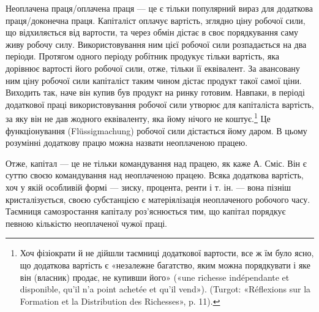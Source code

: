 \parcont{}  %
Неоплачена праця/оплачена праця — це є тільки популярний вираз для
додаткова праця/доконечна праця. Капіталіст оплачує вартість, зглядно ціну
робочої сили, що відхиляється від вартости, та через обмін дістає в своє порядкування саму живу
робочу силу. Використовування ним цієї робочої сили розпадається на два періоди. Протягом одного
періоду робітник продукує тільки вартість,
яка дорівнює вартості його робочої сили, отже, тільки її еквівалент.
За авансовану ним ціну робочої сили капіталіст таким
чином дістає продукт такої самої ціни. Виходить так, наче він
купив був продукт на ринку готовим. Навпаки, в періоді додаткової
праці використовування робочої сили утворює для капіталіста
вартість, за яку він не дав жодного еквіваленту, яка
йому нічого не коштує.\footnote{
Хоч фізіократи й не дійшли таємниці додаткової вартости, все ж
їм було ясно, що додаткова вартість є «незалежне багатство, яким можна
порядкувати і яке він (власник) продає, не купивши його» («une richesse
indépendante et disponible, qu’il n’a point achetée et qu'il vend»). (Turgot:
«Réflexions sur la Formation et la Distribution des Richesses», p. 11).
} Це функціонування (Flüssigmachung)
робочої сили дістається йому даром. В цьому розумінні додаткову
працю можна назвати неоплаченою працею.

Отже, капітал — це не тільки командування над працею,
як каже А. Сміс. Він є суттю своєю командування над неоплаченою
працею. Всяка додаткова вартість, хоч у якій особливій
формі — зиску, процента, ренти і т. ін. — вона пізніш кристалізується,
своєю субстанцією є матеріялізація неоплаченого робочого
часу. Таємниця самозростання капіталу роз’яснюється тим,
що капітал порядкує певною кількістю неоплаченої чужої праці.
